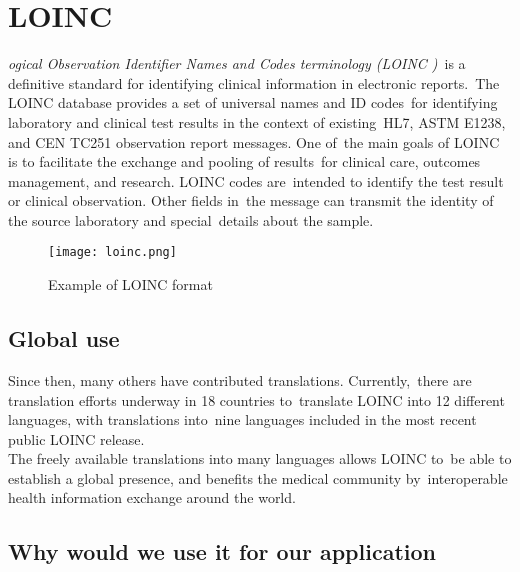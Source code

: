   \section[Logical Observation Identifier Names and Codes terminology\\
  (LOINC\textsuperscript{\textregistered})] 
  {LOINC\textsuperscript{\textregistered}}
  \label{sec:loinc}
  
  \textit{ogical Observation Identifier Names and Codes terminology (LOINC )}\
 is a definitive standard for identifying clinical information in electronic reports.\
The LOINC database provides a set of universal names and ID codes\ 
for identifying laboratory and clinical test results in the context of existing\
 HL7, ASTM E1238, and CEN TC251 observation report messages. One of\
 the main goals of LOINC is to facilitate the exchange and pooling of results\
 for clinical care, outcomes management, and research. LOINC codes are\
 intended to identify the test result or clinical observation. Other fields in\
 the message can transmit the identity of the source laboratory and special\
details about the sample. \citep{_Vreeman_2013}\

 \begin{figure}[ht!]
    \centering
    \texttt{[image: loinc.png]}
    \caption{Example of LOINC format \citep{_loinc_manual_2013}}
    \label{fig:loinc}
  \end{figure}  

\subsection{Global use}

Since then, many others have contributed translations. Currently,\
there are translation efforts underway in 18 countries to\
translate LOINC into 12 different languages, with translations into\
nine languages included in the most recent public LOINC release.\\

\noindent The freely available translations into many languages allows LOINC to\
be able to establish a global presence, and benefits the medical community by\
interoperable health information exchange around the world.\citep{vreeman_enabling_2012}\

 \subsection{Why would we use it for our application}

